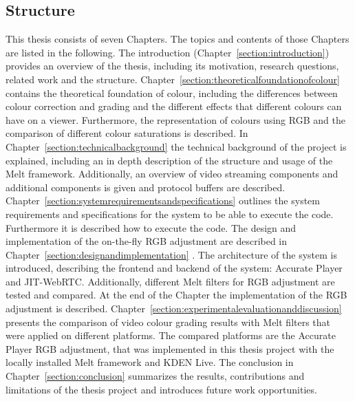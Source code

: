\documentclass[../MasterThesis.tex]{subfiles}
\begin{document}
	\subsection{Structure} \label{subsection:structure}
	
	This thesis consists of seven Chapters. The topics and contents of those Chapters are listed in the following.
	The introduction (Chapter~\ref{section:introduction}) provides an overview of the thesis, including its motivation, research questions, related work and the structure.
	Chapter~\ref{section:theoreticalfoundationofcolour} contains the theoretical foundation of colour, including the differences between colour correction and grading and the different effects that different colours can have on a viewer. Furthermore, the representation of colours using RGB and the comparison of different colour saturations is described.
	In Chapter~\ref{section:technicalbackground} the technical background of the project is explained, including an in depth description of the structure and usage of the Melt framework. Additionally, an overview of video streaming components and additional components is given and protocol buffers are described.
	Chapter~\ref{section:systemrequirementsandspecifications} outlines the system requirements and specifications for the system to be able to execute the code. Furthermore it is described how to execute the code.
	The design and implementation of the on-the-fly RGB adjustment are described in Chapter~\ref{section:designandimplementation} . The architecture of the system is introduced, describing the frontend and backend of the system: Accurate Player and JIT-WebRTC. Additionally, different Melt filters for RGB adjustment are tested and compared. At the end of the Chapter the implementation of the RGB adjustment is described.
	Chapter~\ref{section:experimentalevaluationanddiscussion} presents the comparison of video colour grading results with Melt filters that were applied on different platforms. The compared platforms are the Accurate Player RGB adjustment, that was implemented in this thesis project with the locally installed Melt framework and KDEN Live.
	The conclusion in Chapter~\ref{section:conclusion} summarizes the results, contributions and limitations of the thesis project and introduces future work opportunities.
		

	
	
	

	
	

	
	
	
\end{document}
